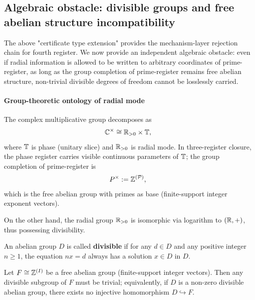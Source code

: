 \subsection{Algebraic obstacle: divisible groups and free abelian structure incompatibility}\label{subsec:fourth-register-divisible}
The above "certificate type extension" provides the mechanism-layer rejection chain for fourth register. We now provide an independent algebraic obstacle: even if radial information is allowed to be written to arbitrary coordinates of prime-register, as long as the group completion of prime-register remains free abelian structure, non-trivial divisible degrees of freedom cannot be losslessly carried.\par

\paragraph{Group-theoretic ontology of radial mode}
The complex multiplicative group decomposes as
$$
\mathbb{C}^\times\cong \mathbb{R}_{>0}\times \mathbb{T},
$$
where $\mathbb{T}$ is phase (unitary slice) and $\mathbb{R}_{>0}$ is radial mode. In three-register closure, the phase register carries visible continuous parameters of $\mathbb{T}$; the group completion of prime-register is
$$
P^\times:=\mathbb{Z}^{(\mathcal{P})},
$$
which is the free abelian group with primes as base (finite-support integer exponent vectors).\par
On the other hand, the radial group $\mathbb{R}_{>0}$ is isomorphic via logarithm to $(\mathbb{R},+)$, thus possessing divisibility.\par

\begin{definition}\label{def:divisible-group}
An abelian group $D$ is called \textbf{divisible} if for any $d\in D$ and any positive integer $n\ge 1$, the equation $nx=d$ always has a solution $x\in D$ in $D$.\par
\end{definition}

\begin{theorem}\label{thm:free-abelian-no-divisible}
Let $F\cong \mathbb{Z}^{(I)}$ be a free abelian group (finite-support integer vectors). Then any divisible subgroup of $F$ must be trivial; equivalently, if $D$ is a non-zero divisible abelian group, there exists no injective homomorphism $D\hookrightarrow F$.\par
\end{theorem}

